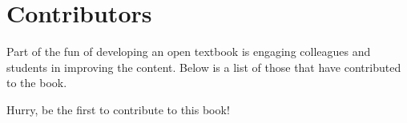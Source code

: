 \chapter{Contributors}
Part of the fun of developing an open textbook is engaging colleagues and students in improving the content.  Below is a list of those that have contributed to the book.

Hurry, be the first to contribute to this book!

